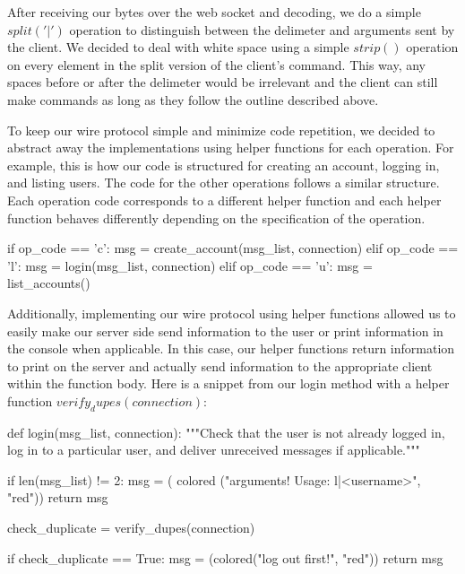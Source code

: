 \documentclass[
	a4paper, %
	10pt, %
	unnumberedsections, %
	twoside, %
]{LTJournalArticle}
\begin{document}
After receiving our bytes over the web socket and decoding, we do a simple 
$split('|')$ operation to distinguish between the delimeter and arguments sent by the client. We decided to deal with white space using a simple $strip()$ operation on every element in the split version of the client's command. This way, any spaces before or after the delimeter would be irrelevant and the client can still make commands as long as they follow the outline described above. 

To keep our wire protocol simple and minimize code repetition, we decided to abstract away the implementations using helper functions for each operation. For example, this is how our code is structured for creating an account, logging in, and listing users. The code for the other operations follows a similar structure. Each operation code corresponds to a different helper function and each helper function behaves differently depending on the specification of the operation.

\begin{python}
    if op_code == 'c': 
        msg = create_account(msg_list, 
        connection)
    elif op_code == 'l':
        msg = login(msg_list, connection)
    elif op_code == 'u':
        msg = list_accounts()
\end{python}

Additionally, implementing our wire protocol using helper functions allowed us to easily make our server side send information to the user or print information in the console when applicable. In this case, our helper functions return information to print on the server and actually send information to the appropriate client within the function body. Here is a snippet from our login method with a helper function $verify_dupes(connection)$: 

\begin{python}
    def login(msg_list, connection):
        """Check that the user is not already 
        logged in, log in to a particular 
        user, and deliver unreceived messages 
        if applicable."""

        if len(msg_list) != 2:
            msg = (
            colored
            ("\nInvalid arguments! 
            Usage: l|<username>\n", 
            "red"))
            return msg

        check_duplicate = 
        verify_dupes(connection)

        if check_duplicate == True:
            msg = (colored("\nPlease log out 
            first!\n", 
            "red"))
            return msg
\end{python}
\end{document}
